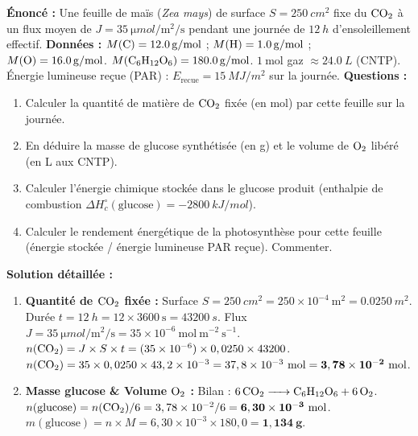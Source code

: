 \documentclass[11pt]{article}
\begin{document}
\begin{exoresolu}
    \textbf{Énoncé :} Une feuille de maïs (\emph{Zea mays}) de surface $S = \SI{250}{cm^2}$ fixe du $\ce{CO2}$ à un flux moyen de $J = \SI{35}{\micro mol\per\square\meter\per\second}$ pendant une journée de $\SI{12}{h}$ d'ensoleillement effectif.
    \textbf{Données :} $M(\ce{C}) = \SI{12,0}{g/mol}$ ; $M(\ce{H}) = \SI{1,0}{g/mol}$ ; $M(\ce{O}) = \SI{16,0}{g/mol}$. $M(\ce{C6H12O6}) = \SI{180,0}{g/mol}$. $1\ \text{mol}$ gaz $\approx \SI{24,0}{L}$ (CNTP). Énergie lumineuse reçue (PAR) : $E_{\text{recue}} = \SI{15}{MJ/m^2}$ sur la journée.
    \textbf{Questions :}
    \begin{enumerate}
        \item Calculer la quantité de matière de $\ce{CO2}$ fixée (en mol) par cette feuille sur la journée.
        \item En déduire la masse de glucose synthétisée (en g) et le volume de $\ce{O2}$ libéré (en L aux CNTP).
        \item Calculer l'énergie chimique stockée dans le glucose produit (enthalpie de combustion $\Delta H_c^\circ(\text{glucose}) = -\SI{2800}{kJ/mol}$).
        \item Calculer le rendement énergétique de la photosynthèse pour cette feuille (énergie stockée / énergie lumineuse PAR reçue). Commenter.
    \end{enumerate}
    \tcblower
    \textbf{Solution détaillée :}
    \begin{enumerate}
        \item \textbf{Quantité de $\ce{CO2}$ fixée :}
            Surface $S = \SI{250}{cm^2} = 250 \times 10^{-4}\ \text{m}^2 = \SI{0,0250}{m^2}$.
            Durée $t = \SI{12}{h} = 12 \times 3600\ \text{s} = \SI{43200}{s}$.
            Flux $J = \SI{35}{\micro mol\per\square\meter\per\second} = 35 \times 10^{-6}\ \text{mol}\ \text{m}^{-2}\ \text{s}^{-1}$.
            $n(\ce{CO2}) = J \times S \times t = (35 \times 10^{-6}) \times 0,0250 \times 43200$.
            $n(\ce{CO2}) = 35 \times 0,0250 \times 43,2 \times 10^{-3} = 37,8 \times 10^{-3}\ \text{mol} = \mathbf{3,78 \times 10^{-2}\ \text{mol}}$.
        \item \textbf{Masse glucose \& Volume $\ce{O2}$ :}
            Bilan : $\ce{6 CO2 -> C6H12O6 + 6 O2}$.
            $n(\text{glucose}) = n(\ce{CO2}) / 6 = 3,78 \times 10^{-2} / 6 = \mathbf{6,30 \times 10^{-3}\ \text{mol}}$.
            $m(\text{glucose}) = n \times M = 6,30 \times 10^{-3} \times 180,0 = \mathbf{1,134\ \text{g}}$.

\end{enumerate}
\end{exoresolu}
\end{document}
